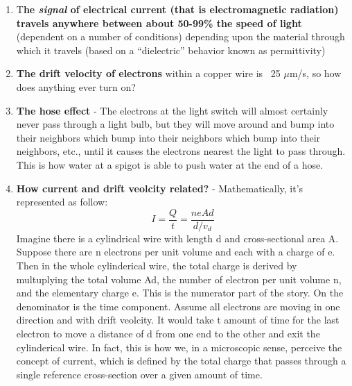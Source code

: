 \documentclass[11pt]{book}
\begin{document}
\begin{enumerate}
	\item T\textbf{he \textit{signal} of electrical current (that is electromagnetic radiation) travels anywhere between about 50-99\% the speed of light} (dependent on a number of conditions) depending upon the material through which it travels (based on a “dielectric” behavior known as permittivity)
	\item \textbf{The drift velocity of electrons} within a copper wire is ~25 $\mu$m/s, so how does anything ever turn on?
	\item \textbf{The hose effect} - The electrons at the light switch will almost certainly never pass through a light bulb, but they will move around and bump into their neighbors which bump into their neighbors which bump into their neighbors, etc., until it causes the electrons nearest the light to pass through. This is how water at a spigot is able to push water at the end of a hose.
	\item \textbf{How current and drift veolcity related?} - Mathematically, it's represented as follow:
	\begin{equation}
		I = \frac{Q}{t} = \frac{neAd}{d/v_d}
	\end{equation}
	Imagine there is a cylindrical wire with length d and cross-sectional area A. Suppose there are n electrons per unit volume and each with a charge of e. Then in the whole cylinderical wire, the total charge is derived by multuplying the total volume Ad, the number of electron per unit volume n, and the elementary charge e. This is the numerator part of the story. On the denominator is the time component. Assume all electrons are moving in one direction and with drift veolcity. It would take t amount of time for the last electron to move a distance of d from one end to the other and exit the cylinderical wire. In fact, this is how we, in a microscopic sense, perceive the concept of current, which is defined by the total charge that passes through a single reference cross-section over a given amount of time. 
\end{enumerate}
\end{document}
